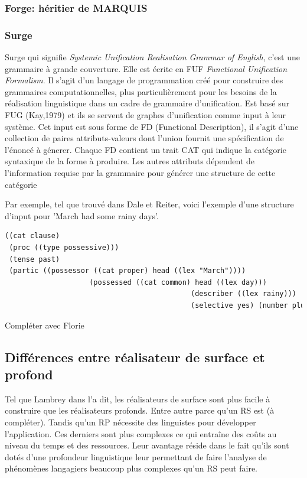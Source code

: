 \subsubsection{Forge: héritier de MARQUIS}
\citep{DBLP:conf/semeval/MilleCBW17}

\subsubsection{Surge}
\citep{Elhadad98surge:a}
Surge qui signifie \emph{Systemic Unification Realisation Grammar of English}, c'est une grammaire à grande couverture. Elle est écrite en FUF \emph{Functional Unification Formalism}. Il s'agit d'un langage de programmation créé pour construire des grammaires computationnelles, plus particulièrement pour les besoins de la réalisation linguistique dans un cadre de grammaire d'unification. Est basé sur FUG (Kay,1979) et ils se servent de graphes d'unification comme input à leur système. Cet input est sous forme de FD (Functional Description), il s'agit d'une collection de paires attributs-valeurs dont l'union fournit une spécification de l'énoncé à génerer. Chaque FD contient un trait CAT qui indique la catégorie syntaxique de la forme à produire. Les autres attributs dépendent de l'information requise par la grammaire pour générer une structure de cette catégorie

Par exemple, tel que trouvé dans Dale et Reiter, voici l'exemple d'une structure d'input pour 'March had some rainy days'.
\begin{lstlisting}[language=Xml, caption=FD: input de Surge]
((cat clause)
 (proc ((type possessive)))
 (tense past)
 (partic ((possessor ((cat proper) head ((lex "March"))))
					(possessed ((cat common) head ((lex day)))
											(describer ((lex rainy)))
											(selective yes) (number plural)))))
\end{lstlisting}

Compléter avec Florie

\subsection{Différences entre réalisateur de surface et profond}
Tel que Lambrey dans \citep{LambreyImplementationcollocationspour2017} l'a dit, les réalisateurs de surface sont plus facile à construire que les réalisateurs profonds. Entre autre parce qu'un RS est (à compléter). Tandis qu'un RP nécessite des linguistes pour développer l'application. Ces derniers sont plus complexes ce qui entraîne des coûts au niveau du temps et des ressources. Leur avantage réside dans le fait qu'ils sont dotés d'une profondeur linguistique leur permettant de faire l'analyse de phénomènes langagiers beaucoup plus complexes qu'un RS peut faire. 

